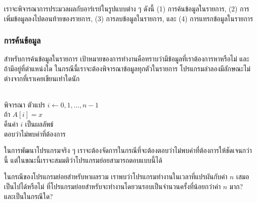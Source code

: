 เรา{\wbr}จะ{\wbr}พิจารณา{\wbr}การ{\wbr}ประมวล{\wbr}ผล{\wbr}กับ{\wbr}อาร์{\wbr}เรย์{\wbr}ใน{\wbr}รูปแบบ{\wbr}ต่าง ๆ ดังนี้ (1) การ{\wbr}ค้น{\wbr}ข้อมูล{\wbr}ใน{\wbr}รายการ, (2) การ{\wbr}เพิ่ม{\wbr}ข้อมูล{\wbr}ลง{\wbr}ไป{\wbr}ตอน{\wbr}ท้าย{\wbr}ของ{\wbr}รายการ, (3) การ{\wbr}ลบ{\wbr}ข้อมูล{\wbr}ใน{\wbr}รายการ, และ (4) การ{\wbr}แทรก{\wbr}ข้อมูล{\wbr}ใน{\wbr}รายการ{\wbr}

\subsubsection{การ{\wbr}ค้น{\wbr}ข้อมูล} 
สำหรับ{\wbr}การ{\wbr}ค้น{\wbr}ข้อมูล{\wbr}ใน{\wbr}รายการ{\wbr}
เป้าหมาย{\wbr}ของ{\wbr}การ{\wbr}ทำงาน{\wbr}คือ{\wbr}ทราบ{\wbr}ว่า{\wbr}มี{\wbr}ข้อมูล{\wbr}ที่{\wbr}เรา{\wbr}ต้องการ{\wbr}หา{\wbr}หรือ{\wbr}ไม่ และ{\wbr}ถ้า{\wbr}มี{\wbr}อยู่{\wbr}ที่{\wbr}ตำแหน่ง{\wbr}ใด{\wbr}
ใน{\wbr}กรณี{\wbr}นี้{\wbr}เรา{\wbr}จะ{\wbr}ต้อง{\wbr}พิจารณา{\wbr}ข้อมูล{\wbr}ทุก{\wbr}ตัว{\wbr}ใน{\wbr}รายการ{\wbr}
โปรแกรม{\wbr}ลำลอง{\wbr}มี{\wbr}ลักษณะ{\wbr}ไม่{\wbr}ต่าง{\wbr}จาก{\wbr}ที่{\wbr}เรา{\wbr}เคย{\wbr}เขียน{\wbr}เท่าใด{\wbr}นัก{\wbr}

\begin{algt}
\\
\hspace*{0.2in} พิจารณา ตัวแปร $i\leftarrow 0,1,\ldots, n-1$\\
\hspace*{0.2in}\hspace*{0.2in} ถ้า $A[i] = x$\\
\hspace*{0.2in}\hspace*{0.2in}\hspace*{0.2in} คืน{\wbr}ค่า $i$ เป็น{\wbr}ผลลัพธ์\\
\hspace*{0.2in} ตอบ{\wbr}ว่า{\wbr}ไม่{\wbr}พบ{\wbr}ค่า{\wbr}ที่{\wbr}ต้องการ{\wbr}
\end{algt}

ใน{\wbr}การ{\wbr}พัฒนา{\wbr}โปรแกรม{\wbr}จริง ๆ
เรา{\wbr}จะ{\wbr}ต้อง{\wbr}จัดการ{\wbr}ใน{\wbr}กรณี{\wbr}ที่{\wbr}จะ{\wbr}ต้อง{\wbr}ตอบ{\wbr}ว่า{\wbr}ไม่{\wbr}พบ{\wbr}ค่า{\wbr}ที่{\wbr}ต้องการ{\wbr}ให้{\wbr}ชัดเจน{\wbr}กว่า{\wbr}นี้{\wbr}
แต่{\wbr}ใน{\wbr}ขณะ{\wbr}นี้{\wbr}เรา{\wbr}จะ{\wbr}สมมติ{\wbr}ว่า{\wbr}โปรแกรม{\wbr}ย่อย{\wbr}สามารถ{\wbr}ตอบ{\wbr}แบบ{\wbr}นี้{\wbr}ได้{\wbr}

\begin{quiz}{}
ใน{\wbr}กรณี{\wbr}ของ{\wbr}โปรแกรม{\wbr}ย่อย{\wbr}สำหรับ{\wbr}หา{\wbr}ผล{\wbr}รวม เรา{\wbr}พบ{\wbr}ว่า{\wbr}โปรแกรม{\wbr}ทำงาน{\wbr}ใน{\wbr}เวลา{\wbr}ที่{\wbr}แปรผัน{\wbr}กับ{\wbr}ค่า $n$
เสมอ เป็น{\wbr}ไป{\wbr}ได้{\wbr}หรือ{\wbr}ไม่ ที่{\wbr}โปรแกรม{\wbr}ย่อย{\wbr}สำหรับ{\wbr}จะ{\wbr}ทำงาน{\wbr}โดย{\wbr}วน{\wbr}รอบ{\wbr}เป็น{\wbr}จำนวน{\wbr}ครั้ง{\wbr}ที่{\wbr}น้อย{\wbr}กว่า{\wbr}ค่า $n$ มาก? และ{\wbr}เป็น{\wbr}ใน{\wbr}กรณี{\wbr}ใด?
\end{quiz}

